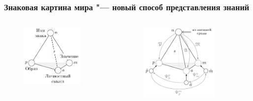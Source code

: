 \documentclass[default]{beamer}
\begin{document}
	\begin{frame}
		\frametitle{Знаковая картина мира "--- новый способ представления знаний}
		\begin{columns}
			\begin{column}{0.5\textwidth}
				\begin{figure}
					\includegraphics[width=0.8\textwidth]{../sign}
				\end{figure}
			\end{column}
			\begin{column}{0.5\textwidth}
				\begin{figure}
					\includegraphics[width=0.8\textwidth]{../sign_naming}

\end{figure}
\end{column}
\end{columns}
\end{frame}
\end{document}
